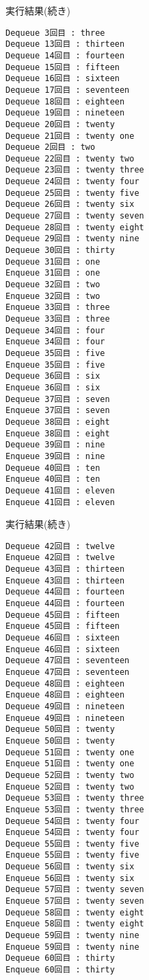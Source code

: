 \documentclass[10pt]{jarticle}
\begin{document}
\begin{itembox}[l]{実行結果(続き)}
  \begin{verbatim}
Dequeue 3回目 : three
Dequeue 13回目 : thirteen
Dequeue 14回目 : fourteen
Dequeue 15回目 : fifteen
Dequeue 16回目 : sixteen
Dequeue 17回目 : seventeen
Dequeue 18回目 : eighteen
Dequeue 19回目 : nineteen
Dequeue 20回目 : twenty
Dequeue 21回目 : twenty one
Dequeue 2回目 : two
Dequeue 22回目 : twenty two
Dequeue 23回目 : twenty three
Dequeue 24回目 : twenty four
Dequeue 25回目 : twenty five
Dequeue 26回目 : twenty six
Dequeue 27回目 : twenty seven
Dequeue 28回目 : twenty eight
Dequeue 29回目 : twenty nine
Dequeue 30回目 : thirty
Dequeue 31回目 : one
Enqueue 31回目 : one
Dequeue 32回目 : two
Enqueue 32回目 : two
Enqueue 33回目 : three
Dequeue 33回目 : three
Dequeue 34回目 : four
Enqueue 34回目 : four
Dequeue 35回目 : five
Enqueue 35回目 : five
Dequeue 36回目 : six
Enqueue 36回目 : six
Dequeue 37回目 : seven
Enqueue 37回目 : seven
Dequeue 38回目 : eight
Enqueue 38回目 : eight
Dequeue 39回目 : nine
Enqueue 39回目 : nine
Dequeue 40回目 : ten
Enqueue 40回目 : ten
Dequeue 41回目 : eleven
Enqueue 41回目 : eleven
  \end{verbatim}
\end{itembox}

\begin{itembox}[l]{実行結果(続き)}
  \begin{verbatim}
Dequeue 42回目 : twelve
Enqueue 42回目 : twelve
Dequeue 43回目 : thirteen
Enqueue 43回目 : thirteen
Dequeue 44回目 : fourteen
Enqueue 44回目 : fourteen
Dequeue 45回目 : fifteen
Enqueue 45回目 : fifteen
Dequeue 46回目 : sixteen
Enqueue 46回目 : sixteen
Dequeue 47回目 : seventeen
Enqueue 47回目 : seventeen
Dequeue 48回目 : eighteen
Enqueue 48回目 : eighteen
Dequeue 49回目 : nineteen
Enqueue 49回目 : nineteen
Dequeue 50回目 : twenty
Enqueue 50回目 : twenty
Dequeue 51回目 : twenty one
Enqueue 51回目 : twenty one
Dequeue 52回目 : twenty two
Enqueue 52回目 : twenty two
Dequeue 53回目 : twenty three
Enqueue 53回目 : twenty three
Dequeue 54回目 : twenty four
Enqueue 54回目 : twenty four
Dequeue 55回目 : twenty five
Enqueue 55回目 : twenty five
Dequeue 56回目 : twenty six
Enqueue 56回目 : twenty six
Dequeue 57回目 : twenty seven
Enqueue 57回目 : twenty seven
Dequeue 58回目 : twenty eight
Enqueue 58回目 : twenty eight
Dequeue 59回目 : twenty nine
Enqueue 59回目 : twenty nine
Dequeue 60回目 : thirty
Enqueue 60回目 : thirty
  \end{verbatim}
\end{itembox}
\end{document}
